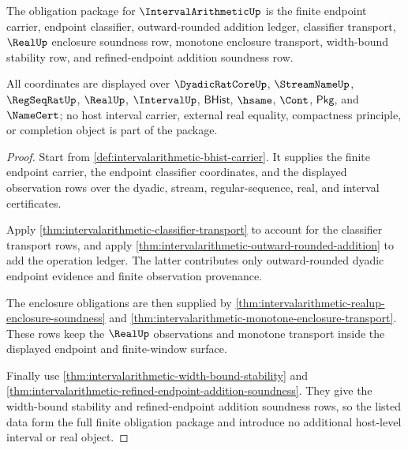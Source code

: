 \begin{theorem}
\label{thm:intervalarithmetic-obligation-enclosure-package}
The obligation package for $\IntervalArithmeticUp$ is the finite endpoint
carrier, endpoint classifier, outward-rounded addition ledger, classifier
transport, $\RealUp$ enclosure soundness row, monotone enclosure transport,
width-bound stability row, and refined-endpoint addition soundness row.

All coordinates are displayed over $\DyadicRatCoreUp$, $\StreamNameUp$,
$\RegSeqRatUp$, $\RealUp$, $\IntervalUp$, $\mathsf{BHist}$, $\hsame$, $\Cont$,
$\mathsf{Pkg}$, and $\NameCert$; no host interval carrier, external real
equality, compactness principle, or completion object is part of the package.
\end{theorem}
\begin{proof}
Start from \autoref{def:intervalarithmetic-bhist-carrier}. It supplies the
finite endpoint carrier, the endpoint classifier coordinates, and the displayed
observation rows over the dyadic, stream, regular-sequence, real, and interval
certificates.

Apply \autoref{thm:intervalarithmetic-classifier-transport} to account for the
classifier transport rows, and apply
\autoref{thm:intervalarithmetic-outward-rounded-addition} to add the operation
ledger. The latter contributes only outward-rounded dyadic endpoint evidence and
finite observation provenance.

The enclosure obligations are then supplied by
\autoref{thm:intervalarithmetic-realup-enclosure-soundness} and
\autoref{thm:intervalarithmetic-monotone-enclosure-transport}. These rows keep
the $\RealUp$ observations and monotone transport inside the displayed endpoint
and finite-window surface.

Finally use \autoref{thm:intervalarithmetic-width-bound-stability} and
\autoref{thm:intervalarithmetic-refined-endpoint-addition-soundness}. They give
the width-bound stability and refined-endpoint addition soundness rows, so the
listed data form the full finite obligation package and introduce no additional
host-level interval or real object.
\end{proof}

